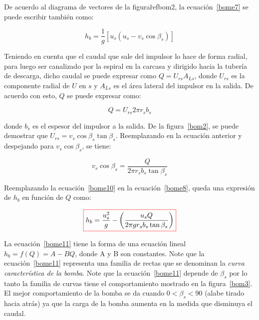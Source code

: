 \documentclass[11pt, oneside]{article}
\begin{document}
De acuerdo al diagrama de vectores de la figura\~ref{bom2}, la ecuaci\'on~\ref{bome7} se puede escribir tambi\'en como:

\begin{equation}
 h_b= \frac{1}{g}  \left[ u_s \left(u_s - v_s \cos \beta_s \right) \right] 
\label{bome8}
\end{equation}

Teniendo en cuenta que el caudal que sale del impulsor lo hace de forma radial, para luego ser canalizado por la espiral en la carcasa y dirigido hacia la tuber\'ia de descarga, dicho caudal se puede expresar como $Q = U_{rs}A_{Ls}$, donde $U_{rs}$ es la componente radial de $U$ en $s$ y $A_{Ls}$ es el \'area lateral del impulsor en la salida. De acuerdo con esto, $Q$ se puede expresar como:

\begin{equation}
Q = U_{rs} 2\pi r_s b_s
\label{bome9}
\end{equation}

donde $b_s$ es el espesor del impulsor a la salida. De la figura~\ref{bom2}, se puede demostrar que $U_{rs} = v_s \cos \beta_s \tan \beta_s$. Reemplazando en la ecuaci\'on anterior y despejando para $v_s \cos \beta_s$, se tiene:

\begin{equation}
v_s \cos \beta_s =\frac{Q}{2\pi r_s b_s \tan \beta_s}
\label{bome10}
\end{equation}

Reemplazando la ecuaci\'on~\ref{bome10} en la ecuaci\'on~\ref{bome8}, queda una expresi\'on de $h_b$ en funci\'on de $Q$ como:

\begin{equation}
\color{red}\boxed{\color{black} h_b = \frac{u_s^2}{g}- \left( \frac{u_s Q}{2\pi g r_s b_s \tan \beta_s}\right) }
\label{bome11}
\end{equation}

La ecuaci\'on~\ref{bome11} tiene la forma de una ecuaci\'on lineal $h_b = f(Q) = A-BQ$, donde A y B son constantes. Note que la ecuaci\'on~\ref{bome11} representa una familia de rectas que se denominan la \emph{curva caracter\'istica de la bomba}. Note que la ecuaci\'on~\ref{bome11} depende de $\beta_s$ por lo tanto la familia de curvas tiene el comportamiento mostrado en la figura~\ref{bom3}. El mejor comportamiento de la bomba se da cuando $0<\beta_s<90$ (alabe tirado hacia atr\'as) ya que la carga de la bomba aumenta en la medida que disminuya el caudal. 
\end{document}
